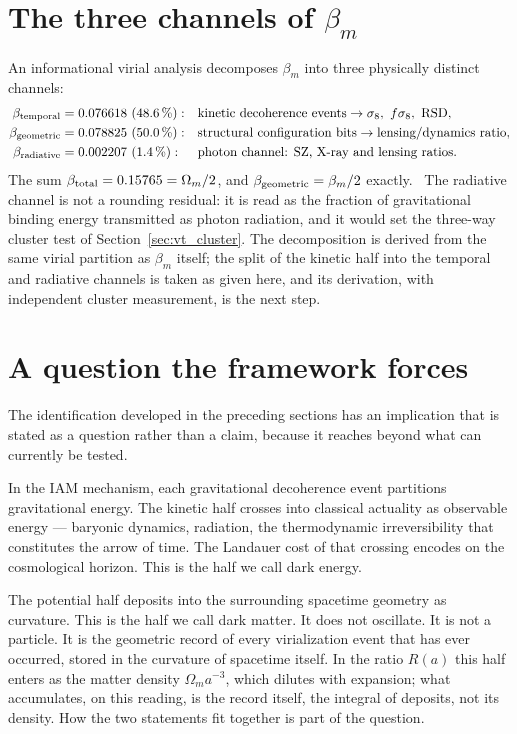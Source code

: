 \section{The three channels of $\beta_m$}\label{sec:vp_channels}
An informational virial analysis decomposes $\beta_m$ into three physically distinct channels:
{\small\begin{align}
\beta_{\rm temporal}&=0.076618\ (48.6\,\%):&&\text{kinetic decoherence events}\to\sigma_8,\ f\sigma_8,\ \text{RSD},\nonumber\\
\beta_{\rm geometric}&=0.078825\ (50.0\,\%):&&\text{structural configuration bits}\to\text{lensing/dynamics ratio},\label{eq:vp_channels}\\
\beta_{\rm radiative}&=0.002207\ (1.4\,\%):&&\text{photon channel: SZ, X-ray and lensing ratios}.\nonumber
\end{align}}
The sum $\beta_{\rm total}=0.15765=\Omega_m/2$, and $\beta_{\rm geometric}=\beta_m/2$ exactly. \calc\ The radiative channel is not a rounding residual: it is
read as the fraction of gravitational binding energy transmitted as photon radiation, and it would set the three-way cluster test of
Section~\ref{sec:vt_cluster}. The decomposition is derived from the same virial partition as $\beta_m$ itself; the split of the kinetic half into the temporal and radiative channels is taken as given here, and its derivation, with independent cluster measurement, is the next step. \conjecture\ \openprob

\section{A question the framework forces}\label{sec:vp_question}
The identification developed in the preceding sections has an implication that is stated as a question rather than a claim, because it reaches beyond what
can currently be tested. \conjecture

In the IAM mechanism, each gravitational decoherence event partitions gravitational energy. The kinetic half crosses into classical actuality as observable
energy --- baryonic dynamics, radiation, the thermodynamic irreversibility that constitutes the arrow of time. The Landauer cost of that crossing encodes
on the cosmological horizon. This is the half we call dark energy.

The potential half deposits into the surrounding spacetime geometry as curvature. This is the half we call dark matter. It does not oscillate. It is not a
particle. It is the geometric record of every virialization event that has ever occurred, stored in the curvature of spacetime itself. In the ratio $R(a)$
this half enters as the matter density $\Omega_ma^{-3}$, which dilutes with expansion; what accumulates, on this reading, is the record itself, the
integral of deposits, not its density. How the two statements fit together is part of the question. \openprob

